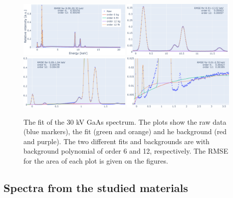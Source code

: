\begin{figure}[p]
    \centering
    \includegraphics[width=0.48\textwidth]{figures/fit/fit_GaAs30kV_whole.png}
    \includegraphics[width=0.48\textwidth]{figures/fit/fit_GaAs30kV_K.png}
    \includegraphics[width=0.48\textwidth]{figures/fit/fit_GaAs30kV_L.png}
    \includegraphics[width=0.48\textwidth]{figures/fit/fit_GaAs30kV_bg.png}
    \caption{
        The fit of the 30 kV GaAs spectrum.
        The plots show the raw data (blue markers), the fit (green and orange) and he background (red and purple).
        The two different fits and backgrounds are with background polynomial of order 6 and 12, respectively.
        The RMSE for the area of each plot is given on the figures.
    }
    \label{fig:results:fit_GaAs30kV}
\end{figure}


\newpage

\subsection{Spectra from the studied materials}
\label{sec:results:qualitative:each_sample_area}

